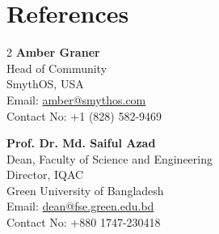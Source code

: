 \documentclass[a4paper,10pt]{extarticle}
\begin{document}
\section{References}
\vspace{1pt}
\begin{multicols}{2}
\noindent
\textbf{\color{accentcolor}Amber Graner} \\
Head of Community \\
SmythOS, USA \\
Email: \href{mailto:amber@smythos.com}{amber@smythos.com} \\
Contact No: +1 (828) 582-9469

\columnbreak

\noindent
\textbf{\color{accentcolor}Prof. Dr. Md. Saiful Azad} \\
Dean, Faculty of Science and Engineering \\
Director, IQAC \\
Green University of Bangladesh \\
Email: \href{mailto:dean@fse.green.edu.bd}{dean@fse.green.edu.bd} \\
Contact No: +880 1747-230418
\end{multicols}
\end{document}
